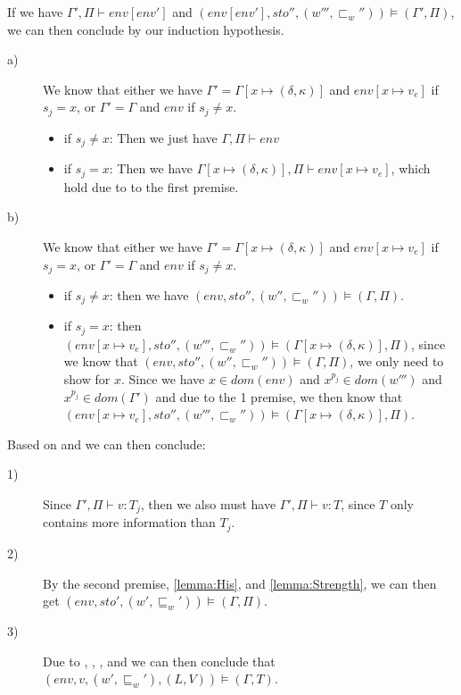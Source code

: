 If we have  $\Gamma',\Pi\vdash env[env']$ and  $(env[env'],sto'',(w''',\sqsubset_w''))\models(\Gamma',\Pi)$, we can then conclude by our induction hypothesis.
\begin{description}
	\item[a)] We know that either we have $\Gamma'=\Gamma[x\mapsto(\delta,\kappa)]$ and $env[x\mapsto v_e]$ if $s_j=x$, or $\Gamma'=\Gamma$ and $env$ if $s_j\neq x$.
		\begin{itemize}
			\item if $s_j\neq x$: Then we just have $\Gamma,\Pi\vdash env$
			\item if $s_j=x$: Then we have $\Gamma[x\mapsto(\delta,\kappa)],\Pi\vdash env[x\mapsto v_e]$, which hold due to to the first premise.
		\end{itemize}
	\item[b)] We know that either we have $\Gamma'=\Gamma[x\mapsto(\delta,\kappa)]$ and $env[x\mapsto v_e]$ if $s_j=x$, or $\Gamma'=\Gamma$ and $env$ if $s_j\neq x$.
		\begin{itemize}
			\item if $s_j\neq x$: then we have $(env,sto'',(w'',\sqsubset_w''))\models(\Gamma,\Pi)$.
			\item if $s_j=x$: then $(env[x\mapsto v_e],sto'',(w''',\sqsubset_w''))\models(\Gamma[x\mapsto(\delta,\kappa)],\Pi)$, since we know that $(env,sto'',(w'',\sqsubset_w''))\models(\Gamma,\Pi)$, we only need to show for $x$.
				Since we have $x\in dom(env)$ and $x^{p_j}\in dom(w''')$ and $x^{p_j}\in dom(\Gamma')$ and due to the 1 premise, we then know that $(env[x\mapsto v_e],sto'',(w''',\sqsubset_w''))\models(\Gamma[x\mapsto(\delta,\kappa)],\Pi)$.
		\end{itemize}
\end{description}
Based on  and  we can then conclude:

\begin{description}
	\item[1)] Since $\Gamma',\Pi\vdash v:T_j$, then we also must have $\Gamma',\Pi\vdash v:T$, since $T$ only contains more information than $T_j$.
	\item[2)] By the second premise, \cref{lemma:His}, and \cref{lemma:Strength}, we can then get $(env,sto',(w',\sqsubseteq_w'))\models(\Gamma,\Pi)$.
	\item[3)] Due to , , , and  we can then conclude that $(env,v,(w',\sqsubseteq_w'),(L,V))\models(\Gamma,T)$.
\end{description}
